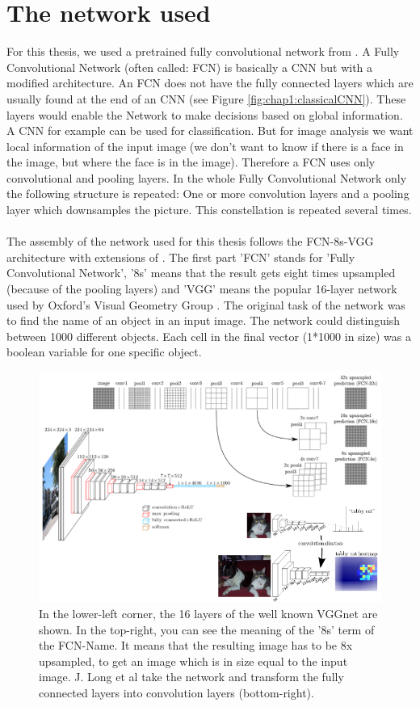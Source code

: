 \section{The network used}
\label{sec:theFCN}
For this thesis, we used a pretrained fully convolutional network from \cite{nirkin2018_faceswap}. A Fully Convolutional Network (often called: FCN) is basically a CNN but with a modified architecture. An FCN does not have the fully connected layers which are usually found at the end of an CNN (see Figure \ref{fig:chap1:classicalCNN}). These layers would enable the Network to make decisions based on global information. A CNN for example can be used for classification. But for image analysis we want local information of the input image (we don't want to know if there is a face in the image, but where the face is in the image). Therefore a FCN uses only convolutional and pooling layers. In the whole Fully Convolutional Network only the following structure is repeated: One or more convolution layers and a pooling layer which downsamples the picture. This constellation is repeated several times.\\
\\
The assembly of the network used for this thesis follows the FCN-8s-VGG architecture with extensions of \cite{jlong}. The first part 'FCN' stands for 'Fully Convolutional Network', '8s' means that the result gets eight times upsampled (because of the pooling layers) and 'VGG' means the popular 16-layer network used by Oxford's Visual Geometry Group \cite{ksimonyan}. The original task of the network was to find the name of an object in an input image. The network could distinguish between 1000 different objects. Each cell in the final vector (1*1000 in size) was a boolean variable for one specific object.

\begin{figure}
	\centering
	\includegraphics[width=1\linewidth]{Figures/fcn_1.png}
	\caption{In the lower-left corner, the 16 layers of the well known VGGnet are shown. In the top-right, you can see the meaning of the '8s' term of the FCN-Name. It means that the resulting image has to be 8x upsampled, to get an image which is in size equal to the input image. J. Long et al \cite{jlong} take the network and transform the fully connected layers into convolution layers (bottom-right).}
\end{figure}


